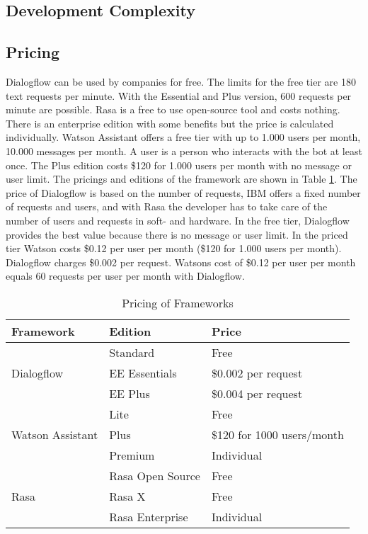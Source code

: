 \subsection*{Development Complexity}
\subsection*{Pricing} \label{sec:pricing}
Dialogflow can be used by companies for free.
The limits for the free tier are 180 text requests per minute.
With the Essential and Plus version, 600 requests per minute are possible.
Rasa is a free to use open-source tool and costs nothing.
There is an enterprise edition with some benefits but the price
is calculated individually.
Watson Assistant offers a free tier with up to 1.000 users per month, 
10.000 messages per month.
A user is a person who interacts with the bot at least once.
The Plus edition costs \$120 for 1.000 users per month with
no message or user limit.
The pricings and editions of the framework are shown in Table \ref{tab:pricing}.
The price of Dialogflow is based on the number of requests,
IBM offers a fixed number of requests and users, and with Rasa the developer has
to take care of the number of users and requests in soft- and hardware.
In the free tier, Dialogflow provides the best value because there is no message or user limit.
In the priced tier Watson costs \$0.12 per user per month (\$120 for 1.000 users per month).
Dialogflow charges \$0.002 per request.
Watsons cost of \$0.12 per user per month equals 60 requests per user per month with Dialogflow.


\begin{table}[H]
    \centering
    \begin{tabular}{ l | l | l }
        Framework & Edition & Price \\ \hline \hline
        \multirow{3}{*}{Dialogflow} & Standard & Free \\
        & EE Essentials &  \$0.002 per request\\
        & EE Plus & \$0.004 per request \\ \hline

        \multirow{3}{*}{Watson Assistant} & Lite & Free \\
        & Plus &  \$120 for 1000 users/month\\
        & Premium & Individual \\ \hline

        \multirow{3}{*}{Rasa} & Rasa Open Source & Free \\
        & Rasa X &  Free\\
        & Rasa Enterprise & Individual \\ 
    \end{tabular}
    \caption{Pricing of Frameworks \cite{rasa, dialogflow, watsonassistant}} \label{tab:pricing}
\end{table} \noindent


